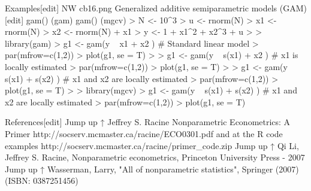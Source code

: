 Examples[edit]
NW cb16.png
Generalized additive semiparametric models (GAM)[edit]
gam() (gam)
gam() (mgcv)
> N <- 10^3
> u <- rnorm(N)
> x1 <- rnorm(N)
> x2 <- rnorm(N) + x1
> y <- 1 + x1^2 + x2^3 + u
> 
> library(gam)
> g1 <- gam(y ~ x1 + x2 ) # Standard linear model
> par(mfrow=c(1,2))
> plot(g1, se = T)
> 
> g1 <- gam(y ~ s(x1) + x2 ) # x1 is locally estimated
> par(mfrow=c(1,2))
> plot(g1, se = T)
> 
> g1 <- gam(y ~ s(x1) + s(x2) ) # x1 and x2 are locally estimated
> par(mfrow=c(1,2))
> plot(g1, se = T)
> 
> library(mgcv)
> g1 <- gam(y ~ s(x1) + s(x2) ) # x1 and x2 are locally estimated
> par(mfrow=c(1,2))
> plot(g1, se = T)


References[edit]
Jump up ↑ Jeffrey S. Racine Nonparametric Econometrics: A Primer http://socserv.mcmaster.ca/racine/ECO0301.pdf and at the R code examples http://socserv.mcmaster.ca/racine/primer_code.zip
Jump up ↑ Qi Li, Jeffrey S. Racine, Nonparametric econometrics, Princeton University Press - 2007
Jump up ↑ Wasserman, Larry, "All of nonparametric statistics", Springer (2007) (ISBN: 0387251456)
